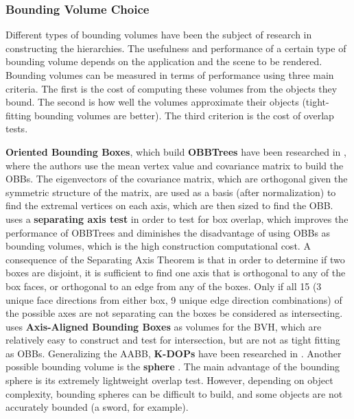 \subsubsection{Bounding Volume Choice}
\label{sub-sub-sec:bvc}

Different types of bounding volumes have been the subject of research in constructing the hierarchies. The usefulness and performance of a certain type of bounding volume depends on the application and the scene to be rendered. Bounding volumes can be measured in terms of performance using three main criteria. The first is the cost of computing these volumes from the objects they bound. The second is how well the volumes approximate their objects (tight-fitting bounding volumes are better). The third criterion is the cost of overlap tests.




\textbf{Oriented Bounding Boxes}, which build \textbf{OBBTrees} have been researched in \citep{gott96}, where the authors use the mean vertex value and covariance matrix to build the OBBs. The eigenvectors of the covariance matrix, which are orthogonal given the symmetric structure of the matrix, are used as a basis (after normalization) to find the extremal vertices on each axis, which are then sized to find the OBB.
\citep{gott96} uses a \textbf{separating axis test} in order to test for box overlap, which improves the performance of OBBTrees and diminishes the disadvantage of using OBBs as bounding volumes, which is the high construction computational cost. A consequence of the Separating Axis Theorem is that in order to determine if two boxes are disjoint, it is sufficient to find one axis that is orthogonal to any of the box faces, or orthogonal to an edge from any of the boxes. Only if all 15 (3 unique face directions from either box, 9 unique edge direction combinations) of the possible axes are not separating can the boxes be considered as intersecting. \citep{vdb97} uses \textbf{Axis-Aligned Bounding Boxes} as volumes for the BVH, which are relatively easy to construct and test for intersection, but are not as tight fitting as OBBs. Generalizing the AABB, \textbf{K-DOPs} have been researched in \citep{klo98}. Another possible bounding volume is the \textbf{sphere} \citep{hub96, rtsd01}. The main advantage of the bounding sphere is its extremely lightweight overlap test. However, depending on object complexity, bounding spheres can be difficult to build, and some objects are not accurately bounded (a sword, for example).

